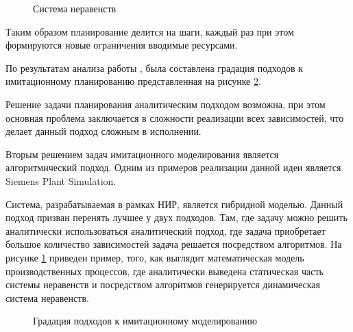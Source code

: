\begin{figure}[H]
    \caption{Система неравенств}
    \label{ris:sys1}
\end{figure}

Таким образом планирование делится на шаги, каждый раз при этом формируются новые ограничения вводимые ресурсами.

По результатам анализа работы \cite{Jahangirian}, была составлена градация подходов к имитационному планированию представленная на рисунке \ref{ris:IM_detalApp}. 

Решение задачи планирования аналитическим подходом возможна, при этом основная проблема заключается в сложности реализации всех зависимостей, что делает данный подход сложным в исполнении.

Вторым решением задач имитационного моделирования является алгоритмический подход. Одним из примеров реализации данной идеи является Siemens Plant Simulation.

Система, разрабатываемая в рамках НИР, является гибридной моделью. Данный подход призван перенять лучшее у двух подходов. Там, где задачу можно решить аналитически использоваться аналитический подход, где задача приобретает большое количество зависимостей задача решается посредством алгоритмов. На рисунке \ref{ris:sys1} приведен пример, того, как выглядит математическая модель производственных процессов, где аналитически выведена статическая часть системы неравенств и посредством алгоритмов генерируется динамическая система неравенств.
\begin{figure}[H]
    \caption{Градация подходов к имитационному моделированию}
    \label{ris:IM_detalApp}
\end{figure}


